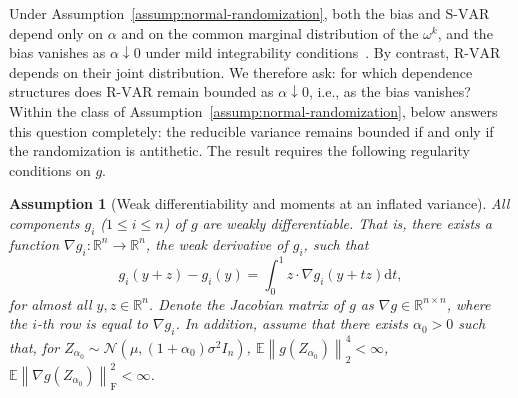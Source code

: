 \documentclass[12pt]{article}
\newtheorem{assumption}{Assumption}[section]
\def\calN{\mathcal{N}}
\newcommand{\norm}[1]{\left\| #1 \right\|}
\theoremstyle{general}
\begin{document}
Under Assumption~\ref{assump:normal-randomization}, both the bias and $\mathrm{S\text{-}VAR}$ depend only on $\alpha$ and on the common marginal distribution of the $\omega^k$, and the bias vanishes as $\alpha\downarrow0$ under mild integrability conditions~\citep{oliveira2024unbiased}.
By contrast, $\mathrm{R\text{-}VAR}$ depends on their joint distribution.
We therefore ask: for which dependence structures does $\mathrm{R\text{-}VAR}$ remain bounded as $\alpha \downarrow 0$, i.e., as the bias vanishes?
Within the class of Assumption~\ref{assump:normal-randomization},  below answers this question completely: the reducible variance remains bounded if and only if the randomization is antithetic. The result requires the following regularity conditions on $g$.

\begin{assumption}[Weak differentiability and moments at an inflated variance]
\label{assump:weakdiff}
    All components $g_i$ ($1 \le i \le n$) of $g$ are weakly differentiable. That is, there exists a function $\nabla g_i : \mathbb{R}^n \to \mathbb{R}^n$, the weak derivative of $g_i$, such that
    $$
g_i(y + z) - g_i(y) = \int_{0}^{1} z \cdot \nabla g_i(y + tz)\mathrm{d}t,
$$
for almost all $y, z \in \mathbb{R}^n$. Denote the Jacobian matrix of $g$ as $\nabla g \in \mathbb{R}^{n \times n}$, where the $i$-th row is equal to $\nabla g_i$.
In addition, assume that there exists $\alpha_0>0$ such that, for
$Z_{\alpha_0}\sim\calN(\mu,(1+\alpha_0)\sigma^2I_n)$,
$\mathbb{E}\norm{g(Z_{\alpha_0})}_2^4 < \infty$,
$\mathbb{E}\norm{\nabla g(Z_{\alpha_0})}_{\mathrm{F}}^2 < \infty$.

\end{assumption}
\end{document}
